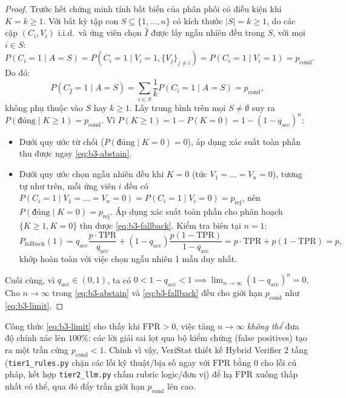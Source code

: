 \begin{proof}
Trước hết chứng minh tính bất biến của phân phối có điều kiện khi $K = k \ge 1$. Với bất kỳ tập con $S \subseteq \{1, \dots, n\}$ có kích thước $|S| = k \ge 1$, do các cặp $(C_i, V_i)$ i.i.d.\ và ứng viên chọn $\hat{I}$ được lấy ngẫu nhiên đều trong $S$, với mọi $i \in S$:
\[
  P(C_i = 1 \mid A = S) = P(C_i = 1 \mid V_i = 1, \{V_j\}_{j \neq i}) = P(C_i = 1 \mid V_i = 1) = p_{\text{cond}}.
\]
Do đó:
\[
  P(C_{\hat{I}} = 1 \mid A = S) = \sum_{i \in S} \frac{1}{k} P(C_i = 1 \mid A = S) = p_{\text{cond}},
\]
không phụ thuộc vào $S$ hay $k \ge 1$. Lấy trung bình trên mọi $S \neq \emptyset$ suy ra $P(\text{đúng} \mid K \ge 1) = p_{\text{cond}}$. Vì $P(K \ge 1) = 1 - P(K = 0) = 1 - (1 - q_{\text{acc}})^n$:
\begin{itemize}
  \item Dưới quy ước từ chối ($P(\text{đúng} \mid K = 0) = 0$), áp dụng xác suất toàn phần thu được ngay \eqref{eq:b3-abstain}.
  \item Dưới quy ước chọn ngẫu nhiên đều khi $K = 0$ (tức $V_1 = \dots = V_n = 0$), tương tự như trên, mỗi ứng viên $i$ đều có $P(C_i = 1 \mid V_1=\dots=V_n=0) = P(C_i = 1 \mid V_i = 0) = p_{\text{rej}}$, nên $P(\text{đúng} \mid K = 0) = p_{\text{rej}}$. Áp dụng xác suất toàn phần cho phân hoạch $\{K \ge 1, K = 0\}$ thu được \eqref{eq:b3-fallback}. Kiểm tra biên tại $n = 1$:
  \[
    P_{\text{fallback}}(1) = q_{\text{acc}} \frac{p \cdot \text{TPR}}{q_{\text{acc}}} + (1 - q_{\text{acc}}) \frac{p(1 - \text{TPR})}{1 - q_{\text{acc}}} = p \cdot \text{TPR} + p(1 - \text{TPR}) = p,
  \]
  khớp hoàn toàn với việc chọn ngẫu nhiên 1 mẫu duy nhất.
\end{itemize}
Cuối cùng, vì $q_{\text{acc}} \in (0, 1)$, ta có $0 < 1 - q_{\text{acc}} < 1 \implies \lim_{n \to \infty} (1 - q_{\text{acc}})^n = 0$. Cho $n \to \infty$ trong \eqref{eq:b3-abstain} và \eqref{eq:b3-fallback} đều cho giới hạn $p_{\text{cond}}$ như \eqref{eq:b3-limit}.
\end{proof}

\begin{remark}
Công thức \eqref{eq:b3-limit} cho thấy khi $\text{FPR} > 0$, việc tăng $n \to \infty$ \emph{không thể} đưa độ chính xác lên $100\%$: các lời giải sai lọt qua bộ kiểm chứng (false positives) tạo ra một trần cứng $p_{\text{cond}} < 1$. Chính vì vậy, VeriStat thiết kế Hybrid Verifier 2 tầng (\texttt{tier1\_rules.py} chặn các lỗi kỹ thuật/bịa số ngay với $\text{FPR}$ bằng $0$ cho lỗi cú pháp, kết hợp \texttt{tier2\_llm.py} chấm rubric logic/đơn vị) để hạ $\text{FPR}$ xuống thấp nhất có thể, qua đó đẩy trần giới hạn $p_{\text{cond}}$ lên cao.
\end{remark}


